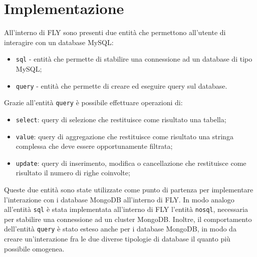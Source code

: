 \section{Implementazione}
All'interno di FLY sono presenti due entità che permettono all'utente di interagire con un database MySQL:
\begin{itemize}
    \item \verb|sql| - entità che permette di stabilire una connessione ad un database di tipo MySQL;
    \item \verb|query| - entità che permette di creare ed eseguire query sul database.
\end{itemize}
Grazie all'entità \verb|query| è possibile effettuare operazioni di:
\begin{itemize}
    \item \verb|select|: query di selezione che restituisce come risultato una tabella;
    \item \verb|value|: query di aggregazione che restituisce come risultato una stringa complessa che deve essere opportunamente filtrata;
    \item \verb|update|: query di inserimento, modifica o cancellazione che restituisce come risultato il numero di righe coinvolte;
\end{itemize}
Queste due entità sono state utilizzate come punto di partenza per implementare l'interazione con i database MongoDB all'interno di FLY. In modo analogo all'entità \verb|sql| è stata implementata all'interno di FLY l'entità \verb|nosql|, necessaria per stabilire una connessione ad un cluster MongoDB. Inoltre, il comportamento dell'entità \verb|query| è stato esteso anche per i database MongoDB, in modo da creare un'interazione fra le due diverse tipologie di database il quanto più possibile omogenea.

